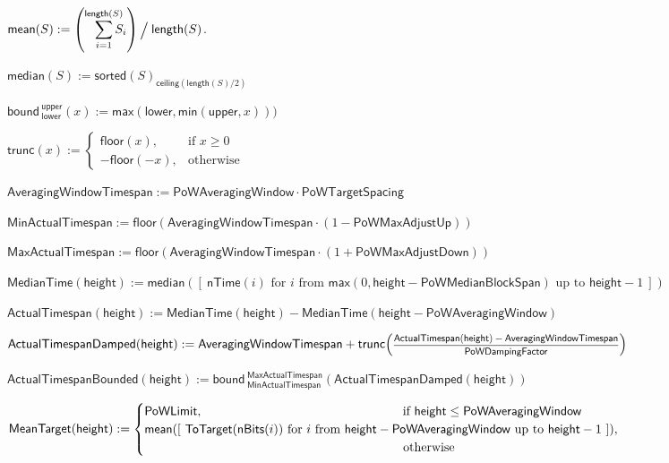 \documentclass{article}
\newcommand{\hfrac}[2]{\scalebox{0.8}{$\genfrac{}{}{0.5pt}{0}{#1}{#2}$}}
\numberwithin{theorem}{subsection}
\newcommand{\listcomp}[1]{[~{#1}~]}
\newcommand{\for}{\text{ for }}
\newcommand{\from}{\text{ from }}
\newcommand{\upto}{\text{ up to }}
\newcommand{\squash}{\!\!\!}
\newcommand{\caseif}{\squash\text{if }}
\newcommand{\caseotherwise}{\squash\text{otherwise}}
\newcommand{\sorted}{\mathsf{sorted}}
\newcommand{\length}{\mathsf{length}}
\newcommand{\mean}{\mathsf{mean}}
\newcommand{\median}{\mathsf{median}}
\newcommand{\bound}[2]{\mathsf{bound\,}_{#1}^{#2}}
\newcommand{\Lower}{\mathsf{lower}}
\newcommand{\Upper}{\mathsf{upper}}
\newcommand{\ToTarget}{\mathsf{ToTarget}}
\newcommand{\minimum}{\mathsf{min}}
\newcommand{\maximum}{\mathsf{max}}
\newcommand{\floor}[1]{\mathsf{floor}\!\left({#1}\right)}
\newcommand{\trunc}[1]{\mathsf{trunc}\!\left({#1}\right)}
\newcommand{\ceiling}[1]{\mathsf{ceiling}\left({#1}\right)}
\newcommand{\vsum}[2]{\smashoperator[r]{\sum_{#1}^{#2}}}
\newcommand{\mult}{\cdot}
\newcommand{\BlockHeight}{\mathsf{height}}
\newcommand{\PoWLimit}{\mathsf{PoWLimit}}
\newcommand{\PoWAveragingWindow}{\mathsf{PoWAveragingWindow}}
\newcommand{\PoWMedianBlockSpan}{\mathsf{PoWMedianBlockSpan}}
\newcommand{\PoWMaxAdjustDown}{\mathsf{PoWMaxAdjustDown}}
\newcommand{\PoWMaxAdjustUp}{\mathsf{PoWMaxAdjustUp}}
\newcommand{\PoWDampingFactor}{\mathsf{PoWDampingFactor}}
\newcommand{\PoWTargetSpacing}{\mathsf{PoWTargetSpacing}}
\newcommand{\MeanTarget}{\mathsf{MeanTarget}}
\newcommand{\MedianTime}{\mathsf{MedianTime}}
\newcommand{\AveragingWindowTimespan}{\mathsf{AveragingWindowTimespan}}
\newcommand{\MinActualTimespan}{\mathsf{MinActualTimespan}}
\newcommand{\MaxActualTimespan}{\mathsf{MaxActualTimespan}}
\newcommand{\ActualTimespan}{\mathsf{ActualTimespan}}
\newcommand{\ActualTimespanDamped}{\mathsf{ActualTimespanDamped}}
\newcommand{\ActualTimespanBounded}{\mathsf{ActualTimespanBounded}}
\newcommand{\nTime}{\mathsf{nTime}}
\newcommand{\nBits}{\mathsf{nBits}}
\begin{document}
\begin{formulae}
\hfuzz=10pt
  \item $\mean(S) := \left( \vsum{i=1}{\length(S)} S_i \right) \raisebox{-0.4ex}{\scalebox{1.4}{/\,}} \length(S)$.
  \item $\median(S) := \sorted(S)_{\ceiling{\length(S) / 2}}$
  \item $\bound{\Lower}{\Upper}(x) := \maximum(\Lower, \minimum(\Upper, x)))$
  \item $\trunc{x} := \begin{cases}
          \floor{x},&\caseif x \geq 0 \\
          -\floor{-x},&\caseotherwise
        \end{cases}$

  \item $\AveragingWindowTimespan := \PoWAveragingWindow \mult \PoWTargetSpacing$
  \item $\MinActualTimespan := \floor{\AveragingWindowTimespan \mult (1 - \PoWMaxAdjustUp)}$
  \item $\MaxActualTimespan := \floor{\AveragingWindowTimespan \mult (1 + \PoWMaxAdjustDown)}$
  \item $\MedianTime(\BlockHeight) := \median(\listcomp{\nTime(i) \for i \from
                                              \maximum(0, \BlockHeight - \PoWMedianBlockSpan) \upto \BlockHeight - 1})$
  \item $\ActualTimespan(\BlockHeight) := \MedianTime(\BlockHeight) - \MedianTime(\BlockHeight - \PoWAveragingWindow)$
  \item $\ActualTimespanDamped(\BlockHeight) := \AveragingWindowTimespan + \trunc{\scalebox{0.98}{\hfrac{\ActualTimespan(\BlockHeight) - \AveragingWindowTimespan}{\PoWDampingFactor}}}$
  \item $\ActualTimespanBounded(\BlockHeight) := \bound{\MinActualTimespan}{\MaxActualTimespan}(\ActualTimespanDamped(\BlockHeight))$
  \item $\MeanTarget(\BlockHeight) := \begin{cases}
          \PoWLimit, \hspace{16em}\text{if } \BlockHeight \leq \PoWAveragingWindow \\
          \mean(\listcomp{\ToTarget(\nBits(i)) \for i \from \BlockHeight - \PoWAveragingWindow \upto \BlockHeight - 1}),\\
                     \hspace{20.7em}\text{otherwise}
        \end{cases}$
\end{formulae}
\end{document}

